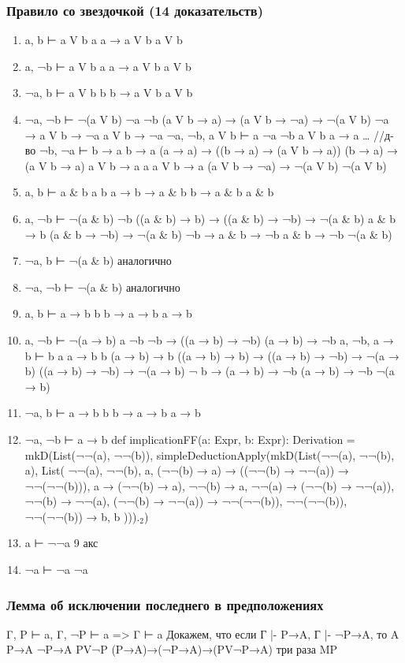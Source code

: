 \documentclass[11pt]{article}
\begin{document}
\subsubsection{Правило со звездочкой (14 доказательств)}
\label{sec-4-1-4}
\begin{enumerate}
\item a, b ⊢ a V b
a
a → a V b
a V b
\item a, ¬b ⊢ a V b
a
a → a V b
a V b
\item ¬a, b ⊢ a V b
b
b → a V b
a V b
\item ¬a, ¬b ⊢ ¬(a V b)
¬a
¬b
(a V b → a) → (a V b → ¬a) → ¬(a V b)
¬a → a V b → ¬a
a V b → ¬a
¬a, ¬b, a V b ⊢ a
¬a
¬b
a V b
a → a
\ldots{} //д-во ¬b, ¬a ⊢ b → a
b → a
(a → a) → ((b → a) → (a V b → a))
(b → a) → (a V b → a)
a V b → a
a
a V b → a
(a V b → ¬a) → ¬(a V b)
¬(a V b)
\item a, b ⊢ a \& b
a
b
a → b → a \& b
b → a \& b
a \& b
\item a, ¬b ⊢ ¬(a \& b)
¬b
((a \& b) → b) → ((a \& b) → ¬b) → ¬(a \& b)
a \& b → b
(a \& b → ¬b) → ¬(a \& b)
¬b → a \& b → ¬b
a \& b → ¬b
¬(a \& b)
\item ¬a, b ⊢ ¬(a \& b)
аналогично
\item ¬a, ¬b ⊢ ¬(a \& b)
аналогично
\item a, b ⊢ a → b
b
b → a → b
a → b
\item a, ¬b ⊢ ¬(a → b)
a
¬b
¬b → ((a → b) → ¬b)
(a → b) → ¬b
a, ¬b, a → b ⊢ b
a
a → b
b
(a → b) → b
((a → b) → b) → ((a → b) → ¬b) → ¬(a → b)
((a → b) → ¬b) → ¬(a → b)
¬ b → (a → b) → ¬b
(a → b) → ¬b
¬(a → b)
\item ¬a, b ⊢ a → b
b
b → a → b
a → b
\item ¬a, ¬b ⊢ a → b
def implicationFF(a: Expr, b: Expr): Derivation =
mkD(List(¬¬(a), ¬¬(b)), simpleDeductionApply(mkD(List(¬¬(a), ¬¬(b), a), List(
¬¬(a),
¬¬(b),
a,
(¬¬(b) → a) → ((¬¬(b) → ¬¬(a)) → ¬¬(¬¬(b))),
a → (¬¬(b) → a),
¬¬(b) → a,
¬¬(a) → (¬¬(b) → ¬¬(a)),
¬¬(b) → ¬¬(a),
(¬¬(b) → ¬¬(a)) → ¬¬(¬¬(b)),
¬¬(¬¬(b)),
¬¬(¬¬(b)) → b,
b
))).$_{\text{2}}$)

\item a ⊢ ¬¬a
9 акс
\item ¬a ⊢ ¬a
¬a
\end{enumerate}
\subsubsection{Лемма об исключении последнего в предположениях}
\label{sec-4-1-5}
Γ, P ⊢ a, Γ, ¬P ⊢ a => Γ ⊢ a
Докажем, что если Г |- P→A, Г |- ¬P→A, то A
P→A
¬P→A
PV¬P
(P→A)→(¬P→A)→(PV¬P→A)
три раза MP
\end{document}
